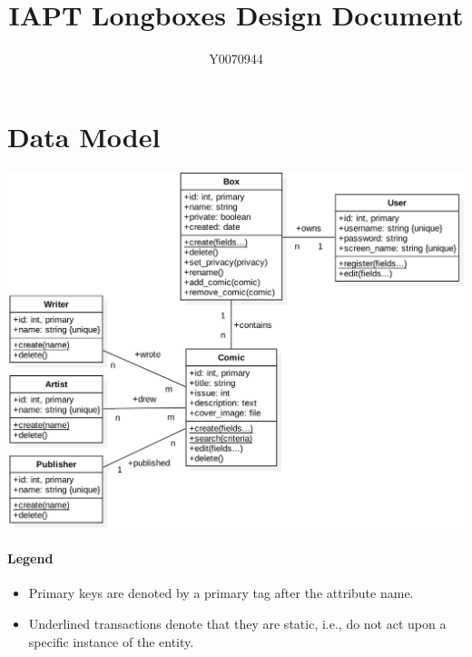 \documentclass[fontsize=12pt,a4paper]{scrreprt}
\author{\textsf{Y0070944}}
\title{IAPT Longboxes Design Document}
\begin{document}
\maketitle
\setcounter{page}{1}

\chapter{Data Model}


\includegraphics[width=\textwidth]{uml.png}

\subsubsection{Legend}
\begin{itemize}
  \item Primary keys are denoted by a \textsf{primary} tag after the attribute name.
  \item Underlined transactions denote that they are static, i.e., do not act upon a specific instance of the entity.
\end{itemize}
\end{document}
